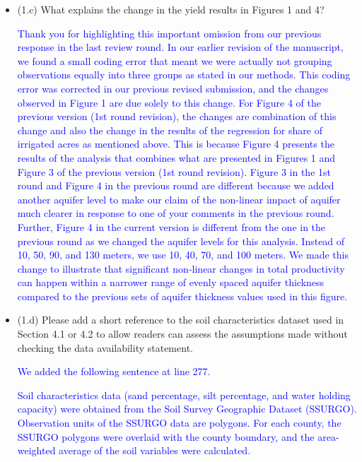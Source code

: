 \documentclass[
]{article}
\begin{document}
\begin{itemize}
\begin{itemize}
  \item (1.c) What explains the change in the yield results in Figures 1 and 4?

  \textcolor{blue}{Thank you for highlighting this important omission from our previous response in the last review round. In our earlier revision of the manuscript, we found a small coding error that meant we were actually not grouping observations equally into three groups as stated in our methods. This coding error was corrected in our previous revised submission, and the changes observed in Figure 1 are due solely to this change. For Figure 4 of the previous version (1st round revision), the changes are combination of this change and also the change in the results of the regression for share of irrigated acres as mentioned above. This is because Figure 4 presents the results of the analysis that combines what are presented in Figures 1 and Figure 3 of the previous version (1st round revision). Figure 3 in the 1st round and Figure 4 in the previous round are different because we added another aquifer level to make our claim of the non-linear impact of aquifer much clearer in response to one of your comments in the previous round. Further, Figure 4 in the current version is different from the one in the previous round as we changed the aquifer levels for this analysis. Instead of 10, 50, 90, and 130 meters, we use 10, 40, 70, and 100 meters. We made this change to illustrate that significant non-linear changes in total productivity can happen within a narrower range of evenly spaced aquifer thickness compared to the previous sets of aquifer thickness values used in this figure.} 
  
  \item (1.d) Please add a short reference to the soil characteristics dataset used in Section 4.1 or 4.2 to allow readers can assess the assumptions made without checking the data availability statement.

  \textcolor{blue}{We added the following sentence at line 277.}
  
  \textcolor{blue}{Soil characteristics data (sand percentage, silt percentage, and water holding capacity) were obtained from the Soil Survey Geographic Dataset (SSURGO). Observation units of the SSURGO data are polygons. For each county, the SSURGO polygons were overlaid with the county boundary, and the area-weighted average of the soil variables were calculated.}

  \end{itemize}


\end{itemize}
\end{document}
